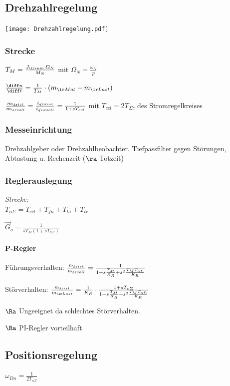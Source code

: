 \documentclass[german]{latex4ei_fs}
\begin{document}
\begin{sectionbox}
\subsection{Drehzahlregelung}
\texttt{[image: Drehzahlregelung.pdf]}

\subsubsection*{Strecke}

$T_M = \frac{J_{\ir sum} \cdot \Omega_N}{M_N}$ mit $\Omega_N = \frac{\omega_N}{p}$

$\frac{\diff n}{\diff t} = \frac{1}{T_M} \cdot (m_{\ir Mot} - m_{\ir Last})$

$\frac{m_{\ir ist}}{m_{\ir soll}} = \frac{i_{q \ir ist}}{i_{q \ir soll}} = \frac{1}{1 + s T_{ccl}}$ mit $T_{ccl} = 2 T_{\Sigma c}$ des Stromregelkreises

\subsubsection*{Messeinrichtung} 

Drehzahlgeber oder Drehzahlbeobachter. Tiefpassfilter gegen Störungen, Abtastung u. Rechenzeit ($\ra$ Totzeit)

\subsubsection*{Reglerauslegung}

\emph{Strecke:} \\
$T_{n \Sigma} = T_{ccl} + T_{fn} + T_{ta} + T_{tr}$

$\vec G_o = \frac{1}{s T_M ( 1+ s T_{n \Sigma})}$ 

\paragraph*{P-Regler}

Führungsverhalten: $\frac{n_{\ir ist}}{n_{\ir soll}} = \frac{1}{1 + s \frac{T_M}{K_R} + s^2 \frac{T_M T_{n \Sigma}}{K_R}}$

Störverhalten: $\frac{n_{\ir ist}}{m_{\ir Last}} = \frac{1}{K_R} \cdot \frac{1 + s T_{n \Sigma}}{1 + s \frac{T_M}{K_R} + s^2 \frac{T_M T_{n \Sigma}}{K_R}}$

$\Ra $ Ungeeignet da schlechtes Störverhalten.

$\Ra$ PI-Regler vorteilhaft
\end{sectionbox}
\begin{sectionbox}
\subsection{Positionsregelung}
$\omega_{Dn} = \frac{1}{2 T_{n \Sigma}}$

\end{sectionbox}
\end{document}
